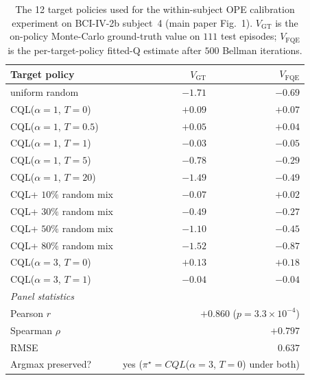 \documentclass[conference]{IEEEtran}
\newcommand{\bcib}{BCI-IV-2b}
\newcommand{\cql}{CQL}
\begin{document}
\begin{table}[h]
\centering
\caption{The 12 target policies used for the within-subject OPE
calibration experiment on \bcib{} subject~4 (main paper Fig.~1).
$V_{\text{GT}}$ is the on-policy Monte-Carlo ground-truth value
on $111$ test episodes; $V_{\text{FQE}}$ is the per-target-policy
fitted-Q estimate after $500$ Bellman iterations.}
\label{tab:sup:ope_panel}
\footnotesize
\begin{tabular}{l r r}
\toprule
Target policy & $V_{\text{GT}}$ & $V_{\text{FQE}}$ \\
\midrule
uniform random                                 & $-1.71$ & $-0.69$ \\
\cql{}($\alpha\!=\!1$, $T\!=\!0$)              & $+0.09$ & $+0.07$ \\
\cql{}($\alpha\!=\!1$, $T\!=\!0.5$)            & $+0.05$ & $+0.04$ \\
\cql{}($\alpha\!=\!1$, $T\!=\!1$)              & $-0.03$ & $-0.05$ \\
\cql{}($\alpha\!=\!1$, $T\!=\!5$)              & $-0.78$ & $-0.29$ \\
\cql{}($\alpha\!=\!1$, $T\!=\!20$)             & $-1.49$ & $-0.49$ \\
\cql{}+ $10\%$ random mix                       & $-0.07$ & $+0.02$ \\
\cql{}+ $30\%$ random mix                       & $-0.49$ & $-0.27$ \\
\cql{}+ $50\%$ random mix                       & $-1.10$ & $-0.45$ \\
\cql{}+ $80\%$ random mix                       & $-1.52$ & $-0.87$ \\
\cql{}($\alpha\!=\!3$, $T\!=\!0$)              & $+0.13$ & $+0.18$ \\
\cql{}($\alpha\!=\!3$, $T\!=\!1$)              & $-0.04$ & $-0.04$ \\
\midrule
\multicolumn{3}{l}{\textit{Panel statistics}} \\
Pearson $r$                                    & \multicolumn{2}{r}{$+0.860$ ($p\!=\!3.3\times 10^{-4}$)} \\
Spearman $\rho$                                & \multicolumn{2}{r}{$+0.797$} \\
RMSE                                           & \multicolumn{2}{r}{$0.637$} \\
Argmax preserved?                              & \multicolumn{2}{r}{yes ($\pi^\star\!=\!\cql$($\alpha\!=\!3$, $T\!=\!0$) under both)} \\
\bottomrule
\end{tabular}
\end{table}
\end{document}
